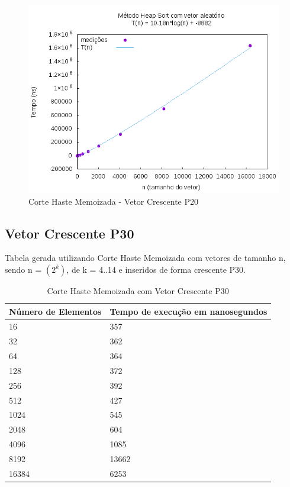 \documentclass[12pt,a4paper,twoside]{report}
\begin{document}
\begin{figure}[H]
    \centering
    \includegraphics[width=0.7\linewidth]{graficos/HeapSort/vIntAleatorio/vIntAleatorio.png}
  \caption{Corte Haste Memoizada - Vetor Crescente P20}
\end{figure}



\subsection{Vetor Crescente P30}
Tabela gerada utilizando Corte Haste Memoizada com vetores de tamanho n, sendo n = $(2^k)$, de k = 4..14 e inseridos de forma crescente P30.
\begin{table}[H]
\centering
\caption{Corte Haste Memoizada com Vetor Crescente P30}
\label{my-label}
\begin{tabular}{|l|l|}
\hline
\multicolumn{1}{|c|}{\textbf{Número de Elementos}} & \multicolumn{1}{c|}{\textbf{Tempo de execução em nanosegundos}} \\ \hline
16 & 357 \\ \hline
32 & 362 \\ \hline
64 & 364 \\ \hline
128 & 372 \\ \hline
256 & 392 \\ \hline
512 & 427 \\ \hline
1024 & 545 \\ \hline
2048 & 604 \\ \hline
4096 & 1085 \\ \hline
8192 & 13662 \\ \hline
16384 & 6253 \\ \hline
\end{tabular}
\end{table}
\end{document}

